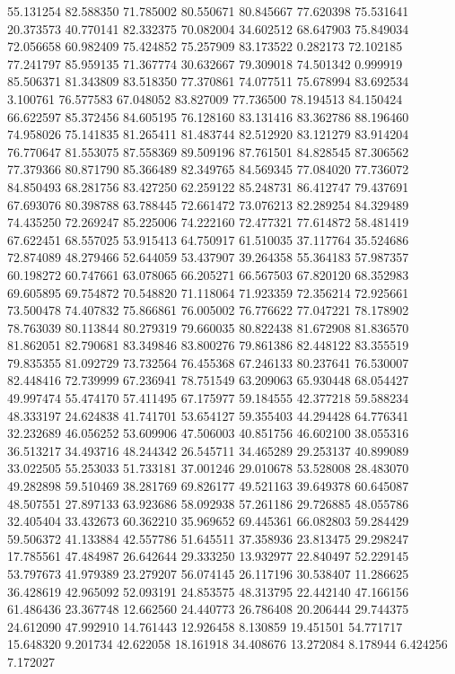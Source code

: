 55.131254
82.588350
71.785002
80.550671
80.845667
77.620398
75.531641
20.373573
40.770141
82.332375
70.082004
34.602512
68.647903
75.849034
72.056658
60.982409
75.424852
75.257909
83.173522
0.282173
72.102185
77.241797
85.959135
71.367774
30.632667
79.309018
74.501342
0.999919
85.506371
81.343809
83.518350
77.370861
74.077511
75.678994
83.692534
3.100761
76.577583
67.048052
83.827009
77.736500
78.194513
84.150424
66.622597
85.372456
84.605195
76.128160
83.131416
83.362786
88.196460
74.958026
75.141835
81.265411
81.483744
82.512920
83.121279
83.914204
76.770647
81.553075
87.558369
89.509196
87.761501
84.828545
87.306562
77.379366
80.871790
85.366489
82.349765
84.569345
77.084020
77.736072
84.850493
68.281756
83.427250
62.259122
85.248731
86.412747
79.437691
67.693076
80.398788
63.788445
72.661472
73.076213
82.289254
84.329489
74.435250
72.269247
85.225006
74.222160
72.477321
77.614872
58.481419
67.622451
68.557025
53.915413
64.750917
61.510035
37.117764
35.524686
72.874089
48.279466
52.644059
53.437907
39.264358
55.364183
57.987357
60.198272
60.747661
63.078065
66.205271
66.567503
67.820120
68.352983
69.605895
69.754872
70.548820
71.118064
71.923359
72.356214
72.925661
73.500478
74.407832
75.866861
76.005002
76.776622
77.047221
78.178902
78.763039
80.113844
80.279319
79.660035
80.822438
81.672908
81.836570
81.862051
82.790681
83.349846
83.800276
79.861386
82.448122
83.355519
79.835355
81.092729
73.732564
76.455368
67.246133
80.237641
76.530007
82.448416
72.739999
67.236941
78.751549
63.209063
65.930448
68.054427
49.997474
55.474170
57.411495
67.175977
59.184555
42.377218
59.588234
48.333197
24.624838
41.741701
53.654127
59.355403
44.294428
64.776341
32.232689
46.056252
53.609906
47.506003
40.851756
46.602100
38.055316
36.513217
34.493716
48.244342
26.545711
34.465289
29.253137
40.899089
33.022505
55.253033
51.733181
37.001246
29.010678
53.528008
28.483070
49.282898
59.510469
38.281769
69.826177
49.521163
39.649378
60.645087
48.507551
27.897133
63.923686
58.092938
57.261186
29.726885
48.055786
32.405404
33.432673
60.362210
35.969652
69.445361
66.082803
59.284429
59.506372
41.133884
42.557786
51.645511
37.358936
23.813475
29.298247
17.785561
47.484987
26.642644
29.333250
13.932977
22.840497
52.229145
53.797673
41.979389
23.279207
56.074145
26.117196
30.538407
11.286625
36.428619
42.965092
52.093191
24.853575
48.313795
22.442140
47.166156
61.486436
23.367748
12.662560
24.440773
26.786408
20.206444
29.744375
24.612090
47.992910
14.761443
12.926458
8.130859
19.451501
54.771717
15.648320
9.201734
42.622058
18.161918
34.408676
13.272084
8.178944
6.424256
7.172027
